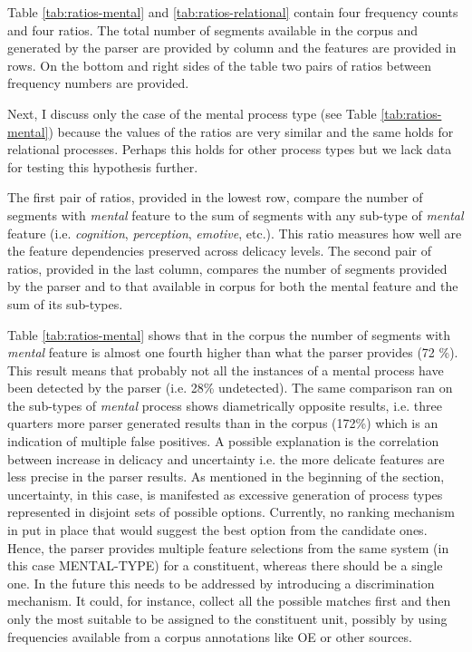     Table \ref{tab:ratios-mental} and \ref{tab:ratios-relational} contain four frequency counts and four ratios. The total number of segments available in the corpus and generated by the parser are provided by column and the features are provided in rows. On the bottom and right sides of the table two pairs of ratios between frequency numbers are provided. 
    
    Next, I discuss only the case of the mental process type (see Table \ref{tab:ratios-mental}) because the values of the ratios are very similar and the same holds for relational processes. Perhaps this holds for other process types but we lack data for testing this hypothesis further. 
    
    The first pair of ratios, provided in the lowest row, compare the number of segments with \textit{mental} feature to the sum of segments with any sub-type of \textit{mental} feature (i.e.  \textit{cognition}, \textit{perception}, \textit{emotive}, etc.). This ratio measures how well are the feature dependencies preserved across delicacy levels. The second pair of ratios, provided in the last column, compares the number of segments provided by the parser and to that available in corpus for both the mental feature and the sum of its sub-types.
    
    Table \ref{tab:ratios-mental} shows that in the corpus the number of segments with \textit{mental} feature is almost one fourth higher than what the parser provides (72 \%). This result means that probably not all the instances of a mental process have been detected by the parser (i.e. 28\% undetected). The same comparison ran on the sub-types of \textit{mental} process shows diametrically opposite results, i.e. three quarters more parser generated results than in the corpus (172\%) which is an indication of multiple false positives. A possible explanation is the correlation between increase in delicacy and uncertainty i.e. the more delicate features are less precise in the parser results. As mentioned in the beginning of the section, uncertainty, in this case, is manifested as excessive generation of process types represented in disjoint sets of possible options. Currently, no ranking mechanism in put in place that would suggest the best option from the candidate ones. Hence, the parser provides multiple feature selections from the same system (in this case MENTAL-TYPE) for a constituent, whereas there should be a single one. In the future this needs to be addressed by introducing a discrimination mechanism. It could, for instance, collect all the possible matches first and then only the most suitable to be assigned to the constituent unit, possibly by using frequencies available from a corpus annotations like OE or other sources.
    
